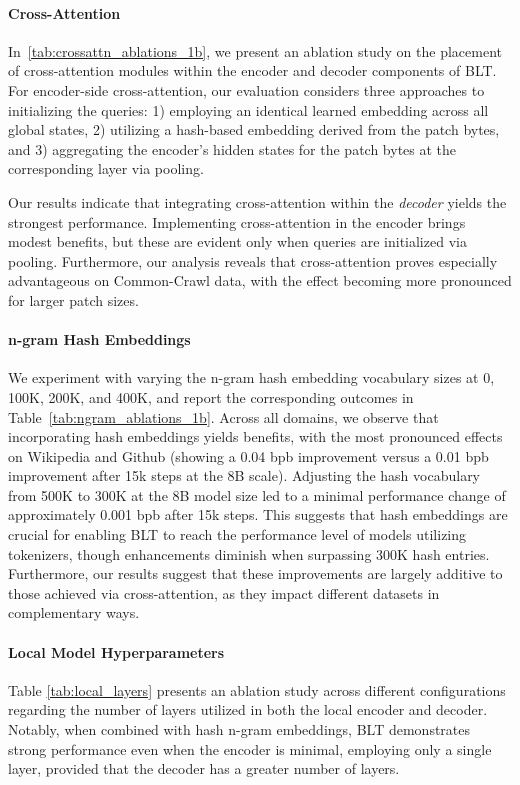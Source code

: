 \paragraph{Cross-Attention} 
In~\autoref{tab:crossattn_ablations_1b}, we present an ablation study on the placement of cross-attention modules within the encoder and decoder components of {\textsc BLT}. For encoder-side cross-attention, our evaluation considers three approaches to initializing the queries: 1) employing an identical learned embedding across all global states, 2) utilizing a hash-based embedding derived from the patch bytes, and 3) aggregating the encoder's hidden states for the patch bytes at the corresponding layer via pooling.

Our results indicate that integrating cross-attention within the \textit{decoder} yields the strongest performance. Implementing cross-attention in the encoder brings modest benefits, but these are evident only when queries are initialized via pooling. Furthermore, our analysis reveals that cross-attention proves especially advantageous on Common-Crawl data, with the effect becoming more pronounced for larger patch sizes.

\paragraph{n-gram Hash Embeddings} 

We experiment with varying the n-gram hash embedding vocabulary sizes at 0, 100K, 200K, and 400K, and report the corresponding outcomes in Table~\ref{tab:ngram_ablations_1b}. Across all domains, we observe that incorporating hash embeddings yields benefits, with the most pronounced effects on Wikipedia and Github (showing a 0.04 bpb improvement versus a 0.01 bpb improvement after 15k steps at the 8B scale). Adjusting the hash vocabulary from 500K to 300K at the 8B model size led to a minimal performance change of approximately 0.001 bpb after 15k steps. This suggests that hash embeddings are crucial for enabling {\textsc BLT} to reach the performance level of models utilizing tokenizers, though enhancements diminish when surpassing 300K hash entries. Furthermore, our results suggest that these improvements are largely additive to those achieved via cross-attention, as they impact different datasets in complementary ways.

\paragraph{Local Model Hyperparameters} Table \ref{tab:local_layers} presents an ablation study across different configurations regarding the number of layers utilized in both the local encoder and decoder. Notably, when combined with hash n-gram embeddings, {\textsc BLT} demonstrates strong performance even when the encoder is minimal, employing only a single layer, provided that the decoder has a greater number of layers.

